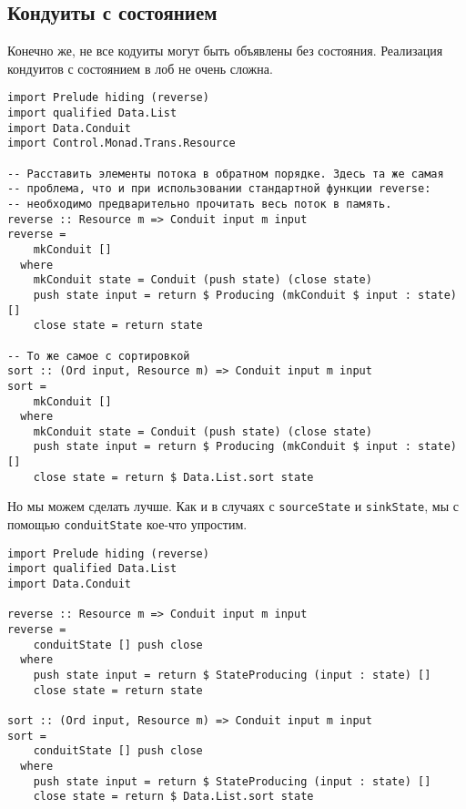 \subsection{Кондуиты с состоянием}
Конечно же, не все кодуиты могут быть объявлены без состояния.  Реализация
кондуитов с состоянием в лоб не очень сложна.
\begin{lstlisting}
import Prelude hiding (reverse)
import qualified Data.List
import Data.Conduit
import Control.Monad.Trans.Resource

-- Расставить элементы потока в обратном порядке. Здесь та же самая
-- проблема, что и при использовании стандартной функции reverse:
-- необходимо предварительно прочитать весь поток в память.
reverse :: Resource m => Conduit input m input
reverse =
    mkConduit []
  where
    mkConduit state = Conduit (push state) (close state)
    push state input = return $ Producing (mkConduit $ input : state) []
    close state = return state

-- То же самое с сортировкой
sort :: (Ord input, Resource m) => Conduit input m input
sort =
    mkConduit []
  where
    mkConduit state = Conduit (push state) (close state)
    push state input = return $ Producing (mkConduit $ input : state) []
    close state = return $ Data.List.sort state
\end{lstlisting}
Но мы можем сделать лучше. Как и в случаях с \lstinline'sourceState' и
\lstinline'sinkState', мы с помощью \lstinline'conduitState' кое-что упростим.
\begin{lstlisting}
import Prelude hiding (reverse)
import qualified Data.List
import Data.Conduit

reverse :: Resource m => Conduit input m input
reverse =
    conduitState [] push close
  where
    push state input = return $ StateProducing (input : state) []
    close state = return state

sort :: (Ord input, Resource m) => Conduit input m input
sort =
    conduitState [] push close
  where
    push state input = return $ StateProducing (input : state) []
    close state = return $ Data.List.sort state
\end{lstlisting}

